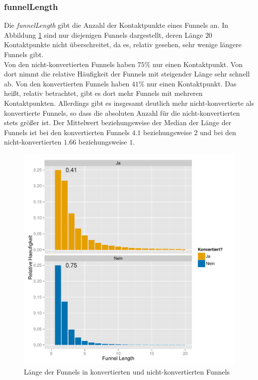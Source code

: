 \subsubsection*{funnelLength}
Die \textit{funnelLength} gibt die Anzahl der Kontaktpunkte eines Funnels an. In Abbildung \ref{funnelLength} sind nur diejenigen Funnels dargestellt, deren Länge $20$ Kontaktpunkte nicht überschreitet, da es, relativ gesehen, sehr wenige längere Funnels gibt.\\
Von den nicht-konvertierten Funnels haben $75 \%$ nur einen Kontaktpunkt. Von dort nimmt die relative Häufigkeit der Funnels mit steigender Länge sehr schnell ab. Von den konvertierten Funnels haben $41 \%$ nur einen Kontaktpunkt. Das heißt, relativ betrachtet, gibt es dort mehr Funnels mit mehreren Kontaktpunkten. Allerdings gibt es insgesamt deutlich mehr nicht-konvertierte als konvertierte Funnels, so dass die absoluten Anzahl für die nicht-konvertierten stets größer ist. Der Mittelwert beziehungsweise der Median der Länge der Funnels ist bei den konvertierten Funnels $4.1$ beziehungsweise $2$ und bei den nicht-konvertierten $1.66$ beziehungsweise $1$. 

\begin{figure}[H]
    \centering
    \includegraphics[scale=0.5]{funnelLength_First.pdf}
    \caption[Länge der Funnels]{Länge der Funnels in konvertierten und nicht-konvertierten Funnels}
    \label{funnelLength}
\end{figure}

